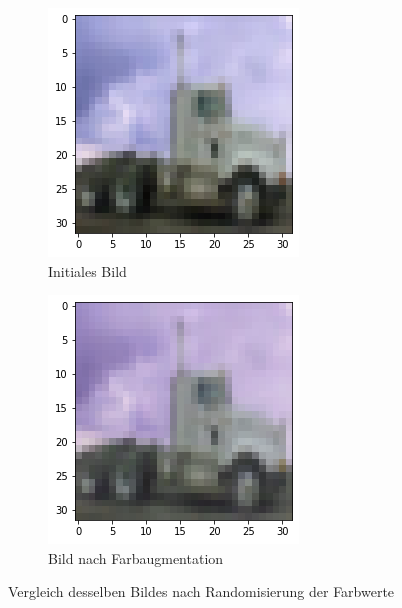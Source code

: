 \begin{figure}[htb]
	\begin{subfigure}[ht]{.5\textwidth}
		\includegraphics[width=\textwidth]{images/flip}
		\caption{Initiales Bild}
		\label{fig:color}
	\end{subfigure}\hfill%
	\begin{subfigure}[ht]{.5\textwidth}
		\includegraphics[width=\textwidth]{images/color_a}
		\caption{Bild nach Farbaugmentation}
		\label{fig:color_a}
	\end{subfigure}\hfill%
	\caption{Vergleich desselben Bildes nach Randomisierung der Farbwerte}
\end{figure}

